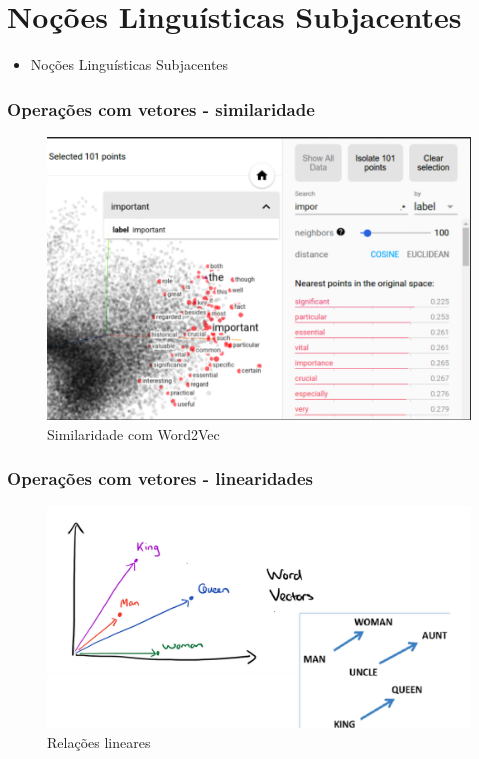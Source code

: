 \documentclass{beamer}
\begin{document}
\section{Noções Linguísticas Subjacentes}

\begin{frame}
\begin{itemize}
    \item \Large{Noções Linguísticas Subjacentes}

\end{itemize}

\end{frame}

\begin{frame}
\frametitle{Operações com vetores - similaridade}
\begin{figure}
	\centering
	\includegraphics[width=0.7\linewidth]{w2v-tensorflow}
	\caption{Similaridade com Word2Vec}
	\label{fig:w2v-tensorflow}
\end{figure}

\end{frame}


\begin{frame}
\frametitle{Operações com vetores - linearidades}
\begin{figure}
	\centering
	\includegraphics[width=0.7\linewidth]{linearidades-2}
	\caption{Relações lineares}
	\label{fig:linearidades-2}
\end{figure}

\end{frame}
\end{document}
